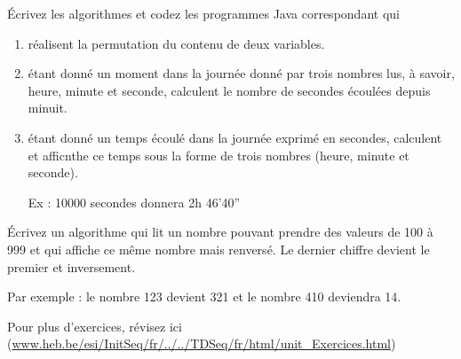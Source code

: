 \documentclass[11pt,a4paper]{article}
\begin{document}
        \'Ecrivez les algorithmes et codez les programmes Java correspondant qui 
          
					\begin{enumerate}
				
			\item r\'ealisent la permutation du contenu de deux variables.
			\item \'etant donn\'e un moment dans la journ\'ee donn\'e par trois nombres lus, \`a savoir, heure, minute et seconde, calculent le nombre de secondes \'ecoul\'ees depuis minuit.
			\item \'etant donn\'e un temps \'ecoul\'e dans la journ\'ee exprim\'e en secondes, calculent et afficnthe ce temps sous la forme de trois nombres (heure, minute et seconde). \par
				
            Ex : 10000 secondes donnera 2h 46'40”
					\end{enumerate}
				
            \par
        
          \'Ecrivez un algorithme qui lit un nombre pouvant prendre des valeurs de 100 \`a 999 et qui affiche ce m\^eme nombre mais renvers\'e. 
          Le dernier chiffre devient le premier et inversement. \par
				
          Par exemple : le nombre 123 devient 321 et le nombre 410 deviendra 14.
        
            \par
        Pour plus d'exercices, 
        r\'evisez ici (\url{www.heb.be/esi/InitSeq/fr/../../TDSeq/fr/html/unit\_Exercices.html})
            \par
        
				
\end{document}
